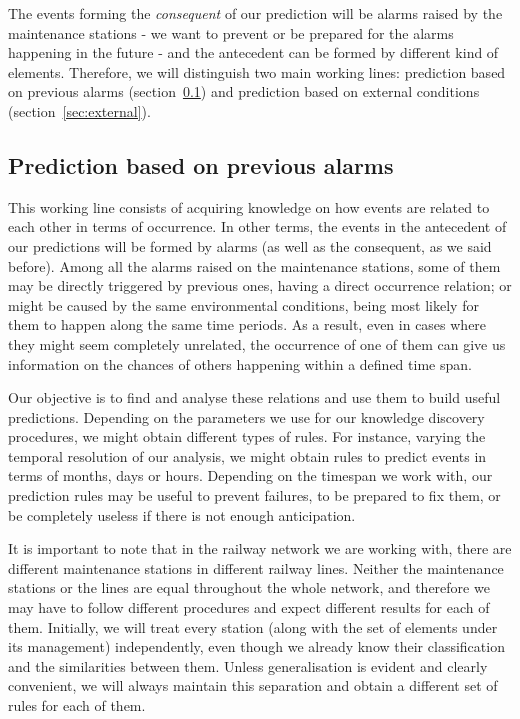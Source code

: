 \documentclass[a4paper,12pt]{article}
\begin{document}
The events forming the \emph{consequent} of our prediction will be alarms raised by the maintenance stations - we want to prevent or be prepared for the alarms happening in the future - and the antecedent can be formed by different kind of elements. Therefore, we will distinguish two main working lines: prediction based on previous alarms (section~\ref{sec:alarm-based-prediction}) and prediction based on external conditions (section~\ref{sec:external}).


\subsection{Prediction based on previous alarms}\label{sec:alarm-based-prediction}
This working line consists of acquiring knowledge on how events are related to each other in terms of occurrence. In other terms, the events in the antecedent of our predictions will be formed by alarms (as well as the consequent, as we said before). Among all the alarms raised on the maintenance stations, some of them may be directly triggered by previous ones, having a direct occurrence relation; or might be caused by the same environmental conditions, being most likely for them to happen along the same time periods. As a result, even in cases where they might seem completely unrelated, the occurrence of one of them can give us information on the chances of others happening within a defined time span.

Our objective is to find and analyse these relations and use them to build useful predictions. Depending on the parameters we use for our knowledge discovery procedures, we might obtain different types of rules. For instance, varying the temporal resolution of our analysis, we might obtain rules to predict events in terms of months, days or hours. Depending on the timespan we work with, our prediction rules may be useful to prevent failures, to be prepared to fix them, or be completely useless if there is not enough anticipation.

It is important to note that in the railway network we are working with, there are different maintenance stations in different railway lines. Neither the maintenance stations or the lines are equal throughout the whole network, and therefore we may have to follow different procedures and expect different results for each of them. Initially, we will treat every station (along with the set of elements under its management) independently, even though we already know their classification and the similarities between them. Unless generalisation is evident and clearly convenient, we will always maintain this separation and obtain a different set of rules for each of them.
\end{document}
